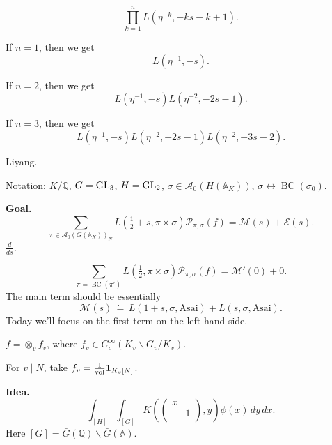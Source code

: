\documentclass[reqno]{amsart} 
\begin{document}
\begin{equation*}
  \prod_{k = 1 }^n L(
  \eta^{-k},
  - k s - k + 1
  ).
\end{equation*}

\begin{example}
  If $n = 1$, then we get
  \begin{equation*}
    L(\eta^{-1}, - s).
  \end{equation*}
\end{example}
\begin{example}
  If $n =2$, then we get
  \begin{equation*}
    L(\eta^{-1}, - s) L(\eta^{-2}, - 2 s -1).
  \end{equation*}
\end{example}
\begin{example}
  If $n=3$, then we get
  \begin{equation*}
    L(\eta^{-1}, - s) L(\eta^{-2}, - 2 s -1) L(\eta^{-2}, - 3 s - 2).
  \end{equation*}
\end{example}

Liyang.

Notation: $K/\mathbb{Q}$, $G = \operatorname{GL}_3$, $H = \operatorname{GL}_2$, $\sigma \in \mathcal{A}_0(H(\mathbb{A}_K))$, $\sigma \leftrightarrow \operatorname{BC}(\sigma_0)$.

\textbf{Goal.}
\begin{equation*}
  \sum_{\pi \in \mathcal{A}_0(G(\mathbb{A}_K ))_N}
  L(\tfrac{1}{2} + s, \pi \times \sigma)
  \mathcal{P}_{\pi, \sigma }(f)
  = \mathcal{M}(s) + \mathcal{E}(s).
\end{equation*}
$\frac{d}{d s}$.

\begin{equation*}
  \sum_{\pi = \operatorname{BC}(\pi ')}
  L(\tfrac{1}{2}, \pi \times \sigma)
  \mathcal{P}_{\pi, \sigma}(f) = \mathcal{M} '(0) + 0.
\end{equation*}
The main term should be essentially
\begin{equation*}
  \mathcal{M}(s) \, \dot{=} \, L(1 + s, \sigma, \mathrm{Asai})
  + L(s, \sigma, \mathrm{Asai}).
\end{equation*}
Today we'll focus on the first term on the left hand side.

$f = \otimes_v f_v$, where $f_v \in C_c^\infty(K_v \backslash G_v / K_v)$.

For $v \mid N$, take $f_v = \frac{1}{\operatorname{vol}} \mathbf{1}_{K_v [N]}$.

\textbf{Idea.}
\begin{equation*}
  \int_{[H]}
  \int_{[G]}
  K \left(
    \begin{pmatrix}
      x      &  \\
             & 1 \\
    \end{pmatrix}, y \right)
  \phi(x) \, d y \,d x.
\end{equation*}
Here $[G] = \bar{G}(\mathbb{Q}) \backslash \bar{G}(\mathbb{A})$.
\end{document}
